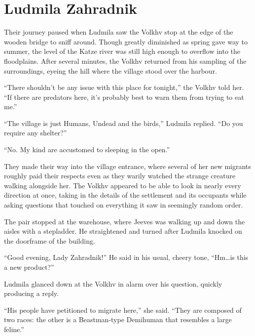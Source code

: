 \chapter{Ludmila Zahradnik}

Their journey paused when Ludmila saw the Volkhv stop at the edge of the wooden bridge to sniff around. Though greatly diminished as spring gave way to summer, the level of the Katze river was still high enough to overflow into the floodplains. After several minutes, the Volkhv returned from his sampling of the surroundings, eyeing the hill where the village stood over the harbour.

 

“There shouldn’t be any issue with this place for tonight,” the Volkhv told her. “If there are predators here, it’s probably best to warn them from trying to eat me.”

 

“The village is just Humans, Undead and the birds,” Ludmila replied. “Do you require any shelter?”

 

“No. My kind are accustomed to sleeping in the open.”

 

They made their way into the village entrance, where several of her new migrants roughly paid their respects even as they warily watched the strange creature walking alongside her. The Volkhv appeared to be able to look in nearly every direction at once, taking in the details of the settlement and its occupants while asking questions that touched on everything it saw in seemingly random order.

 

The pair stopped at the warehouse, where Jeeves was walking up and down the aisles with a stepladder. He straightened and turned after Ludmila knocked on the doorframe of the building.

 

“Good evening, Lady Zahradnik!” He said in his usual, cheery tone, “Hm…is this a new product?”

 

Ludmila glanced down at the Volkhv in alarm over his question, quickly producing a reply.

 

“His people have petitioned to migrate here,” she said. “They are composed of two races: the other is a Beastman-type Demihuman that resembles a large feline.”

 


